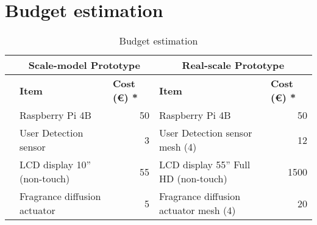 %
\section{Budget estimation}
\label{sec:budget-estimation}

\begingroup
\renewcommand{\arraystretch}{1.1} %
\begin{table}[!hbt]
\addtolength{\tabcolsep}{-2pt}
\footnotesize
\centering
\caption{Budget estimation}
\label{tab:budget-estimation}
\begin{tabular}{llrlr}
\hline
                                                                                                                   & \multicolumn{2}{c}{\textbf{Scale-model Prototype}}                            & \multicolumn{2}{c}{\textbf{Real-scale Prototype}}                                                       \\ \hline
                                                                                                                   & \textbf{Item}                       & \multicolumn{1}{l}{\textbf{Cost (€) *}} & \textbf{Item}                                                 & \multicolumn{1}{l}{\textbf{Cost (€) *}} \\ \hline
\rowcolor[HTML]{FFCE93} 
\cellcolor[HTML]{FFCE93}                                                                                           & Raspberry Pi 4B                     & 50                                      & \cellcolor[HTML]{FFDBB0}Raspberry Pi 4B                       & \cellcolor[HTML]{FFDBB0}50              \\ \cline{2-5} 
\rowcolor[HTML]{FFCE93} 
\cellcolor[HTML]{FFCE93}                                                                                           & User Detection sensor               & 3                                       & \cellcolor[HTML]{FFDBB0}User Detection sensor mesh (4)        & \cellcolor[HTML]{FFDBB0}12              \\ \cline{2-5} 
\rowcolor[HTML]{FFCE93} 
\cellcolor[HTML]{FFCE93}                                                                                           & LCD display 10” (non-touch)         & 55                                      & \cellcolor[HTML]{FFDBB0}LCD display 55” Full HD (non-touch)   & \cellcolor[HTML]{FFDBB0}1500            \\ \cline{2-5} 
\rowcolor[HTML]{FFCE93} 
\cellcolor[HTML]{FFCE93}                                                                                           & Fragrance diffusion actuator        & 5                                       & \cellcolor[HTML]{FFDBB0}Fragrance diffusion actuator mesh (4) & \cellcolor[HTML]{FFDBB0}20              \\ \cline{2-5} 

\end{tabular}
\end{table}

